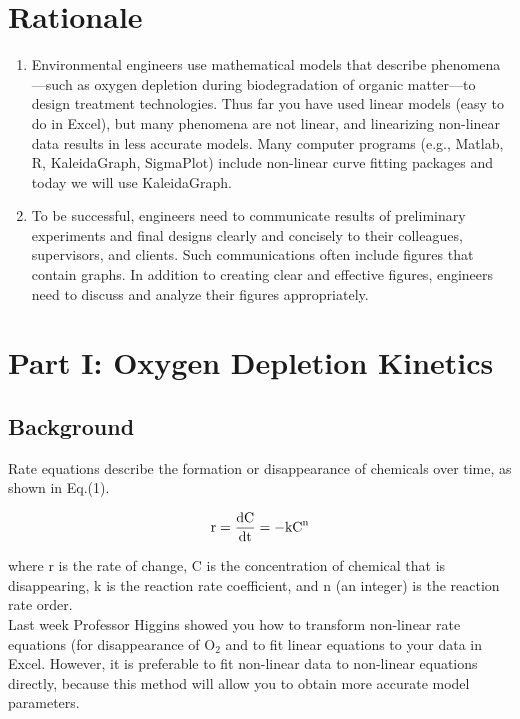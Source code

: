 \documentclass[12pt,letterpaper]{article}
\begin{document}
\section *{Rationale}
\begin{enumerate}
\item Environmental engineers use mathematical models that describe phenomena---such as oxygen depletion during biodegradation of organic matter---to design treatment technologies.  Thus far you have used linear models (easy to do in Excel), but many phenomena are not linear, and linearizing non-linear data results in less accurate models.  Many computer programs (e.g., Matlab, R, KaleidaGraph, SigmaPlot) include non-linear curve fitting packages and today we will use KaleidaGraph.  

\item To be successful, engineers need to communicate results of preliminary experiments and final designs clearly and concisely to their colleagues, supervisors, and clients.  Such communications often include figures that contain graphs.  In addition to creating clear and effective figures, engineers need to discuss and analyze their figures appropriately. 
\end{enumerate}
 



\section *{\textbf{Part I:} Oxygen Depletion Kinetics}

\subsection *{Background}
Rate equations describe the formation or disappearance of chemicals over time, as shown in Eq.(1).  

\begin{align}
\cee{r = \frac{dC}{dt} = -kC^n}
\end{align}

where r is the rate of change, C is the concentration of chemical that is disappearing, k is the reaction rate coefficient, and n (an integer) is the reaction rate order.\\

Last week Professor Higgins showed you how to transform non-linear rate equations (for disappearance of O$_2$ and to fit linear equations to your data in Excel.  However, it is preferable to fit non-linear data to non-linear equations directly, because this method will allow you to obtain more accurate model parameters.  
\end{document}
